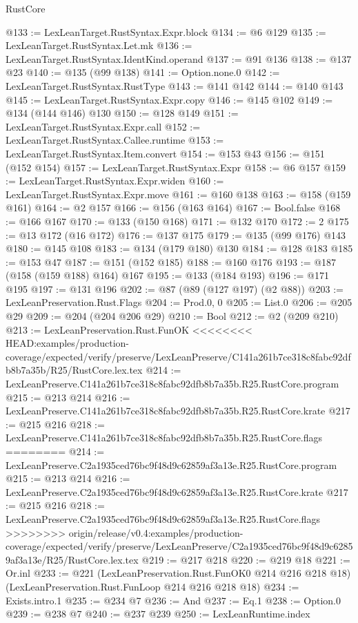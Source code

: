 \begin{lexlean}{RustCore}
\begin{coremodule}
{\begin{coremodule}
{{{{{@133 := LexLeanTarget.RustSyntax.Expr.block
@134 := @6 @129
@135 := LexLeanTarget.RustSyntax.Let.mk
@136 := LexLeanTarget.RustSyntax.IdentKind.operand
@137 := @91 @136
@138 := @137 @23
@140 := @135 (@99 @138)
@141 := Option.none.{0}
@142 := LexLeanTarget.RustSyntax.RustType
@143 := @141 @142
@144 := @140 @143
@145 := LexLeanTarget.RustSyntax.Expr.copy
@146 := @145 @102
@149 := @134 (@144 @146) @130
@150 := @128 @149
@151 := LexLeanTarget.RustSyntax.Expr.call
@152 := LexLeanTarget.RustSyntax.Callee.runtime
@153 := LexLeanTarget.RustSyntax.Item.convert
@154 := @153 @43
@156 := @151 (@152 @154)
@157 := LexLeanTarget.RustSyntax.Expr
@158 := @6 @157
@159 := LexLeanTarget.RustSyntax.Expr.widen
@160 := LexLeanTarget.RustSyntax.Expr.move
@161 := @160 @138
@163 := @158 (@159 @161)
@164 := @2 @157
@166 := @156 (@163 @164)
@167 := Bool.false
@168 := @166 @167
@170 := @133 (@150 @168)
@171 := @132 @170
@172 := 2
@175 := @13 @172 (@16 @172)
@176 := @137 @175
@179 := @135 (@99 @176) @143
@180 := @145 @108
@183 := @134 (@179 @180) @130
@184 := @128 @183
@185 := @153 @47
@187 := @151 (@152 @185)
@188 := @160 @176
@193 := @187 (@158 (@159 @188) @164) @167
@195 := @133 (@184 @193)
@196 := @171 @195
@197 := @131 @196
@202 := @87 (@89 (@127 @197) (@2 @88))
@203 := LexLeanPreservation.Rust.Flags
@204 := Prod.{0, 0}
@205 := List.{0}
@206 := @205 @29
@209 := @204 (@204 @206 @29)
@210 := Bool
@212 := @2 (@209 @210)
@213 := LexLeanPreservation.Rust.FunOK
<<<<<<<< HEAD:examples/production-coverage/expected/verify/preserve/LexLeanPreserve/C141a261b7ce318c8fabc92dfb8b7a35b/R25/RustCore.lex.tex
@214 := LexLeanPreserve.C141a261b7ce318c8fabc92dfb8b7a35b.R25.RustCore.program
@215 := @213 @214
@216 := LexLeanPreserve.C141a261b7ce318c8fabc92dfb8b7a35b.R25.RustCore.krate
@217 := @215 @216
@218 := LexLeanPreserve.C141a261b7ce318c8fabc92dfb8b7a35b.R25.RustCore.flags
========
@214 := LexLeanPreserve.C2a1935ced76bc9f48d9c62859af3a13e.R25.RustCore.program
@215 := @213 @214
@216 := LexLeanPreserve.C2a1935ced76bc9f48d9c62859af3a13e.R25.RustCore.krate
@217 := @215 @216
@218 := LexLeanPreserve.C2a1935ced76bc9f48d9c62859af3a13e.R25.RustCore.flags
>>>>>>>> origin/release/v0.4:examples/production-coverage/expected/verify/preserve/LexLeanPreserve/C2a1935ced76bc9f48d9c62859af3a13e/R25/RustCore.lex.tex
@219 := @217 @218
@220 := @219 @18
@221 := Or.inl
@233 := @221
    (LexLeanPreservation.Rust.FunOK0 @214 @216 @218 @18)
    (LexLeanPreservation.Rust.FunLoop @214 @216 @218 @18)
@234 := Exists.intro.{1}
@235 := @234 @7
@236 := And
@237 := Eq.{1}
@238 := Option.{0}
@239 := @238 @7
@240 := @237 @239
@250 := LexLeanRuntime.index
}}}}}
\end{coremodule}}
\end{coremodule}
\end{lexlean}
